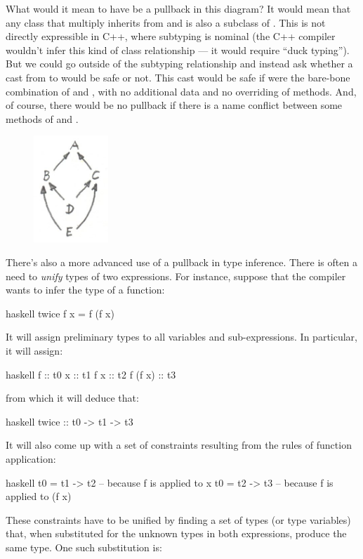 What would it mean to have  be a pullback in this diagram? It would
mean that any class  that multiply inherits from  and  is also a
subclass of . This is not directly expressible in C++, where subtyping
is nominal (the C++ compiler wouldn't infer this kind of class
relationship --- it would require ``duck typing''). But we could go
outside of the subtyping relationship and instead ask whether a cast
from  to  would be safe or not. This cast would be safe if  were the
bare-bone combination of  and , with no additional data and no
overriding of methods. And, of course, there would be no pullback if
there is a name conflict between some methods of  and .

\begin{figure}[H]
\centering
\includegraphics[width=0.25\textwidth]{images/classes.jpg}
\end{figure}

\noindent
There's also a more advanced use of a pullback in type inference. There
is often a need to \emph{unify} types of two expressions. For instance,
suppose that the compiler wants to infer the type of a function:

\begin{snip}{haskell}
twice f x = f (f x)
\end{snip}
It will assign preliminary types to all variables and sub-expressions.
In particular, it will assign:

\begin{snip}{haskell}
f       :: t0
x       :: t1
f x     :: t2
f (f x) :: t3
\end{snip}
from which it will deduce that:

\begin{snip}{haskell}
twice :: t0 -> t1 -> t3
\end{snip}
It will also come up with a set of constraints resulting from the rules
of function application:

\begin{snip}{haskell}
t0 = t1 -> t2 -- because f is applied to x
t0 = t2 -> t3 -- because f is applied to (f x)
\end{snip}
These constraints have to be unified by finding a set of types (or type
variables) that, when substituted for the unknown types in both
expressions, produce the same type. One such substitution is:

